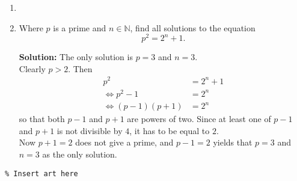 \documentclass{article}
\begin{document}
\begin{enumerate}[itemsep=\fill]
\item %


\item %
Where $p$ is a prime and $n\in\mathbb{N}$, find all solutions to the equation \[p^2 = 2^n + 1.\]

\textbf{Solution:} The only solution is $p = 3$ and $n = 3$.
\\ Clearly $p>2$. Then 
\begin{align*}
	p^2 &= 2^n + 1
	\\ \iff p^2-1 &= 2^n
	\\ \iff (p-1)(p+1) &= 2^n
\end{align*}
so that both $p-1$ and $p+1$ are powers of two. Since at least one of $p-1$ and $p+1$ is not divisible by $4$, it has to be equal to $2$.
\\ Now $p+1 = 2$ does not give a prime, and $p-1 = 2$ yields that $p =3$ and $n=3$ as the only solution. 


\end{enumerate}


\centering
\small
\begin{BVerbatim}
\end{BVerbatim}
\end{document}
